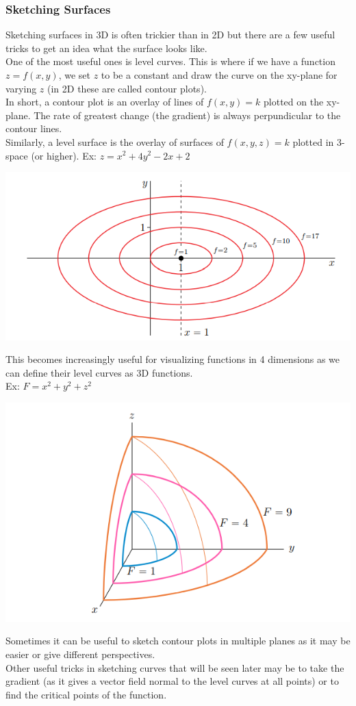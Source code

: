 \subsubsection{Sketching Surfaces}
Sketching surfaces in 3D is often trickier than in 2D but there are a few useful tricks to get an idea what the surface looks like.\\
One of the most useful ones is level curves. This is where if we have a function $z=f(x,y)$, we set $z$ to be a constant and draw the curve on the xy-plane for varying $z$ (in 2D these are called contour plots).\\
In short, a contour plot is an overlay of lines of $f(x,y)=k$ plotted on the xy-plane. The rate of greatest change (the gradient) is always perpundicular to the contour lines.\\
Similarly, a level surface is the overlay of surfaces of $f(x,y,z)=k$ plotted in 3-space (or higher).
Ex: $z=x^2+4y^2-2x+2$\\
\centerline{\includegraphics[scale=0.8]{Images/Math217Pictures/contourPlot.png}}
This becomes increasingly useful for visualizing functions in 4 dimensions as we can define their level curves as 3D functions.\\
Ex: $F=x^2+y^2+z^2$\\
\centerline{\includegraphics[scale=0.8]{Images/Math217Pictures/levelCurves.png}}
Sometimes it can be useful to sketch contour plots in multiple planes as it may be easier or give different perspectives.\\
Other useful tricks in sketching curves that will be seen later may be to take the gradient (as it gives a vector field normal to the level curves at all points) or to find the critical points of the function.

